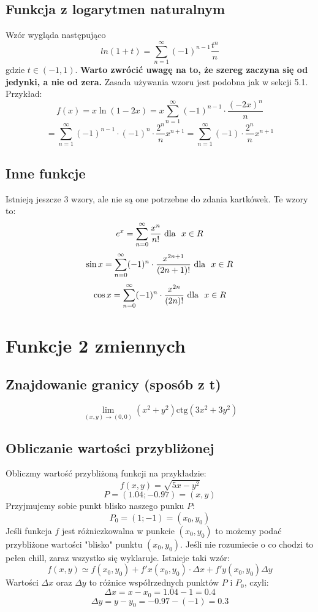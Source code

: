 \documentclass[11pt]{article}
\begin{document}
\subsection{Funkcja z logarytmen naturalnym}
\vbox{
    Wzór wygląda następująco
    \[
        ln(1 + t) = \sum_{n = 1}^{\infty}(-1)^{n - 1} \frac{t^n}{n}
    \]
    gdzie $t \in (-1, 1)$. \textbf{Warto zwrócić uwagę na to, że szereg zaczyna
    się od jedynki, a nie od zera.}
    Zasada używania wzoru jest podobna jak w sekcji 5.1. Przykład:
    \[
        f(x) = x \ln(1 - 2x) = 
        x \sum_{n = 1}^{\infty}(-1)^{n - 1} \cdot \frac{(-2x)^n}{n}
    \]
    \[
        = \sum_{n = 1}^{\infty}(-1)^{n - 1} \cdot (-1)^{n} \cdot \frac{2^n}{n} x^{n + 1}
        = \sum_{n = 1}^{\infty} (-1) \cdot \frac{2^n}{n} x^{n + 1}
    \]
}

\subsection{Inne funkcje}
\vbox{
    Istnieją jeszcze 3 wzory, ale nie są one potrzebne do zdania kartkówek.
    Te wzory to:
    \[
        e^x = \sum_{n = 0}^{\infty} \frac{x^n}{n!} \text{\space dla \space} x \in R
    \]
    \[
        \sin{x} = \sum_{n = 0}^{\infty} (-1)^n \cdot \frac{x^{2n + 1}}{(2n + 1)!} \text{\space dla \space} x \in R
    \]
    \[
        \cos{x} = \sum_{n = 0}^{\infty} (-1)^n \cdot \frac{x^{2n}}{(2n)!} \text{\space dla \space} x \in R
    \]
}

\section{Funkcje 2 zmiennych}
\subsection{Znajdowanie granicy (sposób z t)}
\vbox{
    \[
        \lim_{(x,y) \to (0,0)}(x^2 + y^2) \text{ctg} (3x^2 + 3y^2)
    \]
}
\subsection{Obliczanie wartości przybliżonej}
\vbox{
    Obliczmy wartość przybliżoną funkcji na przykładzie:
    \[
        f(x, y) = \sqrt{5x - y^2}
    \]
    \[
        P = (1.04;-0.97) = (x, y)
    \]
    Przyjmujemy sobie punkt blisko naszego punku $P$:
    \[
        P_0 = (1; -1) = (x_0, y_0)
    \]
    Jeśli funkcja $f$ jest różniczkowalna w punkcie $(x_0,y_0)$ to możemy 
    podać przybliżone wartości "blisko" punktu $(x_0, y_0)$. Jeśli nie rozumiecie
    o co chodzi to pełen chill, zaraz wszystko się wyklaruje. Istnieje taki wzór:
    \[
        f(x, y) \simeq f(x_0, y_0) + f'x(x_0, y_0) \cdot \Delta x + f'y(x_0, y_0) \Delta y
    \]
    Wartości $\Delta x$ oraz $\Delta y$ to różnice współrzednych punktów $P$ i $P_0$, czyli:
    \[
        \Delta x = x - x_0 = 1.04 - 1 = 0.4
    \]
    \[
        \Delta y = y - y_0 = -0.97 - (-1) = 0.3
    \]
}
\end{document}
